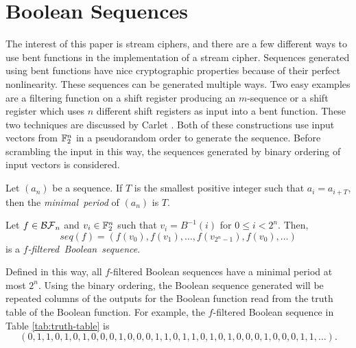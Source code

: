 \section{Boolean Sequences}\label{sec:boolean-sequences}
\par The interest of this paper is stream ciphers, and there are a few
different ways to use bent functions in the implementation of a stream
cipher. Sequences generated using bent functions have nice cryptographic
properties because of their perfect nonlinearity. These sequences can be
generated multiple ways. Two easy examples are a filtering function on a
shift register producing an $m$-sequence or a shift register which uses $n$
different shift registers as input into a bent function. These two
techniques are discussed by Carlet \cite{col:c06}. Both of these
constructions use input vectors from $\mathbb{F}_2^n$ in a pseudorandom order to
generate the sequence. Before scrambling the input in this way, the
sequences generated by binary ordering of input vectors is
considered.

\begin{definition}
  Let $(a_n)$ be a sequence. If $T$ is the smallest positive integer such that
  $a_i=a_{i+T}$, then the {\em minimal\ period} of $(a_n)$ is $T$.
\end{definition}

\begin{definition}\label{def:lex-Bool-seq}
  Let $f\in\mathcal{BF}_n$ and $v_i\in\mathbb{F}_2^n$ such that $v_i=B^{-1}(i)$ for
  $0\leq i<2^n$. Then,
  \begin{equation}
    seq(f)=(f(v_0),f(v_1),\dots,f(v_{2^n-1}),f(v_0),\dots)
  \end{equation}
  is a {\em $f$-filtered\ Boolean\ sequence}.
\end{definition}

\par Defined in this way, all $f$-filtered Boolean sequences have a
minimal period at most $2^n$. Using the binary ordering, the Boolean
sequence generated will be repeated columns of the outputs for the Boolean
function read from the truth table of the Boolean function. For example, the
$f$-filtered Boolean sequence in Table \ref{tab:truth-table} is
\[
(0,1,1,0,1,0,1,0,0,0,1,0,0,0,1,1,0,1,1,0,1,0,1,0,0,0,1,0,0,0,1,1,\dots).
\]

